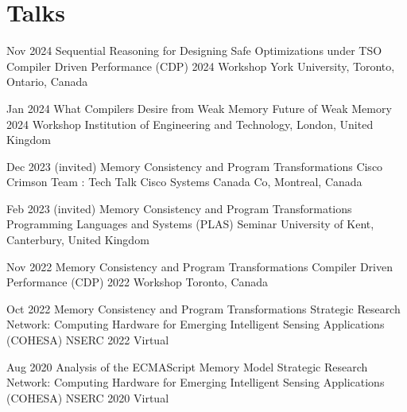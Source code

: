\section{Talks}

    \cventry
        {Nov 2024}
        {Sequential Reasoning for Designing Safe Optimizations under TSO}
        {Compiler Driven Performance (CDP) 2024 Workshop}
        {York University, Toronto, Ontario, Canada}
        {}
        {}


    \cventry
        {Jan 2024}
        {What Compilers Desire from Weak Memory}
        {Future of Weak Memory 2024 Workshop}
        {Institution of Engineering and Technology, London, United Kingdom}
        {}
        {}


    \cventry
        {Dec 2023 (invited)}
        {Memory Consistency and Program Transformations}
        {Cisco Crimson Team : Tech Talk}
        {Cisco Systems Canada Co, Montreal, Canada}
        {}
        {}


    \cventry
        {Feb 2023 (invited)}
        {Memory Consistency and Program Transformations}
        {Programming Languages and Systems (PLAS) Seminar}
        {University of Kent, Canterbury, United Kingdom}
        {}
        {}

    \cventry
        {Nov 2022}
        {Memory Consistency and Program Transformations}
        {Compiler Driven Performance (CDP) 2022 Workshop}
        {Toronto, Canada}
        {}
        {}

    \cventry
        {Oct 2022}
        {Memory Consistency and Program Transformations}
        {Strategic Research Network: Computing Hardware for Emerging Intelligent Sensing Applications (COHESA) NSERC 2022}
        {Virtual}
        {}
        {}

    \cventry
        {Aug 2020}
        {Analysis of the ECMAScript Memory Model}
        {Strategic Research Network: Computing Hardware for Emerging Intelligent Sensing Applications (COHESA) NSERC 2020}
        {Virtual}
        {}
        {}
